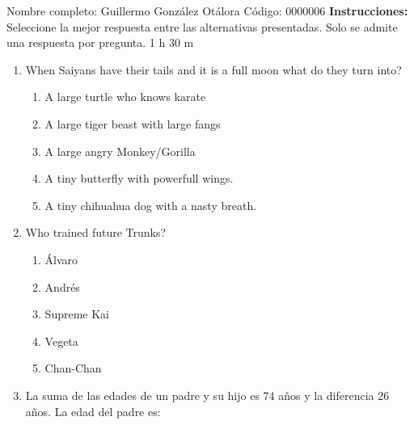 \documentclass[letterpaper,addpoints,answers,twocolumn,10pt]{exam}
\begin{document}
\noindent Nombre completo: Guillermo González Otálora
\newline \newline \newline \newline
Código: 0000006\newline \newline 
{\bf Instrucciones:} Seleccione la mejor respuesta entre las alternativas presentadas. Solo se admite una respuesta por pregunta.
 1 h 30 m

\begin{enumerate}[leftmargin=.2in]




\item  When Saiyans have their tails and it is a full moon what do they turn into?


\begin{enumerate}[noitemsep,leftmargin=0in]


\item  A large turtle who knows karate
\item  A large tiger beast with large fangs
\item  A large angry Monkey/Gorilla
\item  A tiny butterfly with powerfull wings.
\item  A tiny chihuahua dog with a nasty breath.


\end{enumerate}



\item  Who trained future Trunks?


\begin{enumerate}[noitemsep,leftmargin=0in]


\item  Álvaro
\item  Andrés
\item  Supreme Kai
\item  Vegeta
\item  Chan-Chan


\end{enumerate}



\item  La suma de las edades de un padre y su hijo es 74 años y la diferencia 26 años. La edad del padre es:


\begin{enumerate}[noitemsep,leftmargin=0in]



\end{enumerate}
\end{enumerate}
\end{document}
